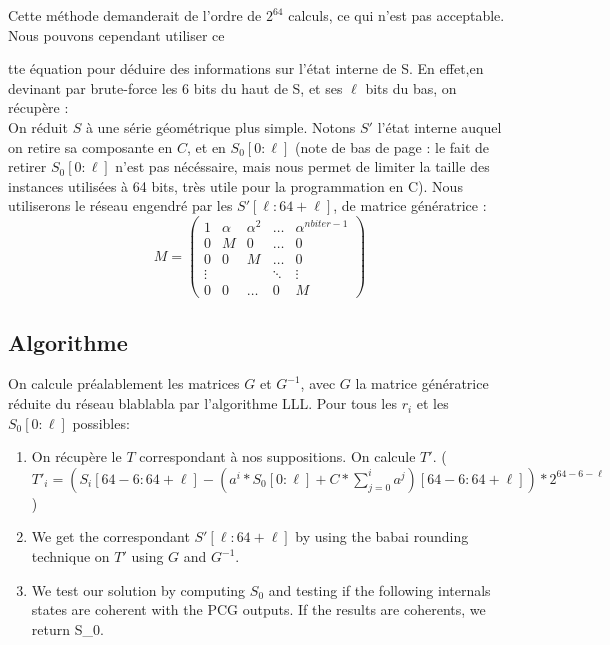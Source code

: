 \documentclass[preprint]{iacrtrans}
\begin{document}
Cette méthode demanderait de l'ordre de $2^{64}$ calculs, ce qui n'est pas acceptable. Nous pouvons cependant utiliser ce{tte équation pour déduire des informations sur l'état interne de S. En effet,en devinant par brute-force les 6 bits du haut de S, et ses $\ell$ bits du bas, on récupère :\\

On réduit $S$ à une série géométrique plus simple. Notons $S'$ l'état interne auquel on retire sa composante en $C$, et en $S_0[0:\ell]$ (note de bas de page : le fait de retirer $S_0[0:\ell]$ n'est pas nécéssaire, mais nous permet de limiter la taille des instances utilisées à 64 bits, très utile pour la programmation en C). Nous utiliserons le réseau engendré par les $S'[\ell : 64 + \ell]$, de matrice génératrice :\\
\begin{equation}
M =
\begin{pmatrix} 
1 & \alpha & \alpha ^2 & \dots & \alpha ^{nbiter - 1}\\
0 & M & 0 & \dots & 0\\
0 & 0 & M & \dots & 0\\
\vdots & & & \ddots & \vdots\\
0 & 0 & \dots & 0 & M
\end{pmatrix}
\end{equation}


\subsection{Algorithme}
On calcule préalablement les matrices $G$ et $G^{-1}$, avec $G$ la matrice génératrice réduite du réseau blablabla par l'algorithme LLL.
Pour tous les $r_i$ et les $S_0[0 : \ell]$ possibles:\\
\begin{enumerate}
\item On récupère le $T$ correspondant à nos suppositions. On calcule $T'$. ($T'_i = (S_i[64 - 6 : 64 + \ell] - (a^i*S_0[0 : \ell] + C * \sum_{j = 0}^i a^j)[64 - 6 : 64 + \ell]) * 2^{64 - 6 - \ell}$)\\

\item We get the correspondant $S'[\ell : 64 + \ell]$ by using the babai rounding technique on $T'$ using $G$ and $G^{-1}$.

\item We test our solution by computing $S_0$ and testing if the following internals states are coherent with the PCG outputs. If the results are coherents, we return S_0.


\end{enumerate}}
\end{document}
